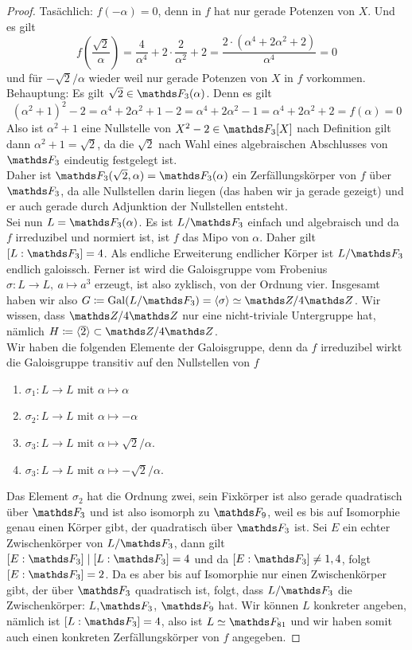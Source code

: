 \begin{proof}
    Tasächlich: $f(-\alpha)=0$, denn in $f$ hat nur gerade Potenzen von $X$. Und es gilt 
    \[
    f(\frac{\sqrt{2}}{\alpha}) = \frac{4}{\alpha^4} + 2\cdot \frac{2}{\alpha^2} + 2 = \frac{2\cdot (\alpha^4+2\alpha^2+2)}{\alpha^4} = 0   
    \]
    und für $-\sqrt{2}/\alpha$ wieder weil nur gerade Potenzen von $X$ in $f$ vorkommen. Behauptung: Es gilt $\sqrt{2}\in \F_3(\alpha)$. Denn es gilt 
    \[
    (\alpha^2+1)^2-2 = \alpha^4+2\alpha^2+1-2 = \alpha^4+2\alpha^2-1 = \alpha^4+2\alpha^2+2=f(\alpha) = 0    
    \]
    Also ist $\alpha^2+1$ eine Nullstelle von $X^2-2\in \F_3[X]$ nach Definition gilt dann $\alpha^2+1=\sqrt{2}$, da die $\sqrt{2}$ nach Wahl eines algebraischen Abschlusses von $\F_3$ eindeutig festgelegt ist.
    \\ Daher ist $\F_3(\sqrt{2},\alpha) = \F_3(\alpha)$ ein Zerfällungskörper von $f$ über $\F_3$, da alle Nullstellen darin liegen (das haben wir ja gerade gezeigt) und er auch gerade durch Adjunktion der Nullstellen entsteht. \\
    Sei nun $L=\F_3(\alpha)$. Es ist $L/\F_3$ einfach und algebraisch und da $f$ irreduzibel und normiert ist, ist $f$ das Mipo von $\alpha$. Daher gilt $[L:\F_3]= 4$. Als endliche Erweiterung endlicher Körper ist $L/\F_3$ endlich galoissch. Ferner ist wird die Galoisgruppe vom Frobenius $\sigma:L\to L, \ a\mapsto a^3$ erzeugt, ist also zyklisch, von der Ordnung vier. Insgesamt haben 
    wir also $G\coloneqq \gal(L/\F_3) = \langle \sigma\rangle \simeq \Z/4\Z$. Wir wissen, dass $\Z/4\Z$ nur eine nicht-triviale Untergruppe hat, nämlich $H\coloneqq \langle \overline{2}\rangle\subset \Z/4\Z$.
    \\ Wir haben die folgenden Elemente der Galoisgruppe, denn da $f$ irreduzibel wirkt die Galoisgruppe transitiv auf den Nullstellen von $f$
    \begin{enumerate}[(1)]
        \item $\sigma_1:L\to L$ mit $\alpha\mapsto \alpha$
        \item $\sigma_2:L\to L$ mit $\alpha\mapsto -\alpha$
        \item $\sigma_3:L\to L$ mit $\alpha \mapsto \sqrt{2}/\alpha$.
        \item $\sigma_3:L\to L$ mit $\alpha\mapsto -\sqrt{2}/\alpha$.
    \end{enumerate} 
    Das Element $\sigma_2$ hat die Ordnung zwei, sein Fixkörper ist also gerade quadratisch über $\F_3$ und ist also isomorph zu $\F_9$, weil es bis auf Isomorphie genau einen Körper gibt, der quadratisch über $\F_3$ ist. Sei $E$ ein echter Zwischenkörper von $L/\F_3$, dann gilt $[E:\F_3] \mid [L:\F_3]=4$ und da $[E:\F_3]\neq 1,4$, folgt $[E:\F_3]=2$. Da es aber bis auf Isomorphie nur einen Zwischenkörper gibt, der über $\F_3$ quadratisch ist, 
    folgt, dass $L/\F_3$ die Zwischenkörper: $L$,$\F_3$, $\F_9$ hat. Wir können $L$ konkreter angeben, nämlich ist $[L:\F_3]=4$, also ist $L\simeq \F_{81}$ und wir haben somit auch einen konkreten Zerfällungskörper von $f$ angegeben.
\end{proof}